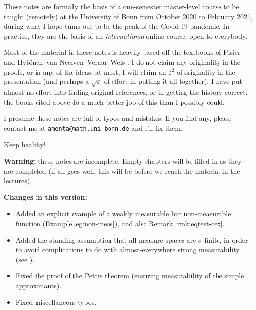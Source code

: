 These notes are formally the basis of a one-semester master-level course to be taught (remotely) at the University of Bonn from October 2020 to February 2021, during what I hope turns out to be the peak of the Covid-19 pandemic.
In practise, they are the basis of an \emph{international} online course, open to everybody.

Most of the material in these notes is heavily based off the textbooks of Pisier \cite{gP16} and Hyt\"onen--van Neerven--Veraar--Weis \cite{HNVW16, HNVW17}.
I do not claim any originality in the proofs, or in any of the ideas; at most, I will claim an $\varepsilon^2$ of originality in the presentation (and perhaps a $\sqrt{\varepsilon}$ of effort in putting it all together).
I have put almost no effort into finding original references, or in getting the history correct: the books cited above do a much better job of this than I possibly could.

\vspace{1cm}

I presume these notes are full of typos and mistakes.
If you find any, please contact me at \texttt{amenta@math.uni-bonn.de} and I'll fix them.

\vspace{1cm}

Keep healthy! 




\vspace{2cm}

\textbf{Warning:} these notes are incomplete.
Empty chapters will be filled in as they are completed (if all goes well, this will be before we reach the material in the lectures).

\textbf{Changes in this version:}
\begin{itemize}
\item Added an explicit example of a weakly measurable but non-measurable function (Example \ref{eg:non-meas}), and also Remark \ref{rmk:eqtest-cex}.
\item Added the standing assumption that all measure spaces are $\sigma$-finite, in order to avoid complications to do with almost-everywhere strong measurability (see \cite[Section 1.1.b]{HNVW16}).
\item Fixed the proof of the Pettis theorem (ensuring measurability of the simple approximants).
\item Fixed miscellaneous typos.
\end{itemize}





